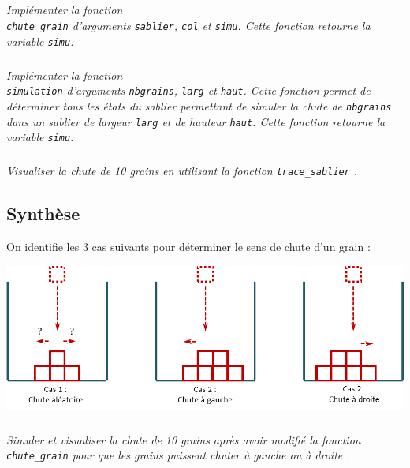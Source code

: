 \documentclass[10pt,fleqn]{article} %
\begin{document}
\begin{multicols}{2}
\subparagraph{}\textit{Implémenter la fonction \\ \texttt{chute\_grain} d'arguments \texttt{sablier}, \texttt{col} et \texttt{simu}. Cette fonction retourne la variable \texttt{simu}. }


\subparagraph{}\textit{Implémenter la fonction \\ \texttt{simulation} d'arguments \texttt{nbgrains}, \texttt{larg} et \texttt{haut}. Cette fonction permet de déterminer tous les états du sablier permettant de simuler la chute de \texttt{nbgrains} dans un sablier de largeur \texttt{larg} et de hauteur \texttt{haut}. Cette fonction retourne la variable \texttt{simu}. }

\subparagraph{}\textit{Visualiser la chute de 10 grains en utilisant la fonction \texttt{trace\_sablier} . }


\subsection*{Synthèse}


On identifie les 3 cas suivants pour déterminer le sens de chute d'un grain :
\begin{center}
\includegraphics[width=\linewidth]{images/sablier_03}
\end{center}

\subparagraph{}\textit{Simuler et visualiser la chute de 10 grains après avoir modifié la fonction \texttt{chute\_grain} pour que les grains puissent chuter à gauche ou à droite . }



\end{multicols}
\end{document}
